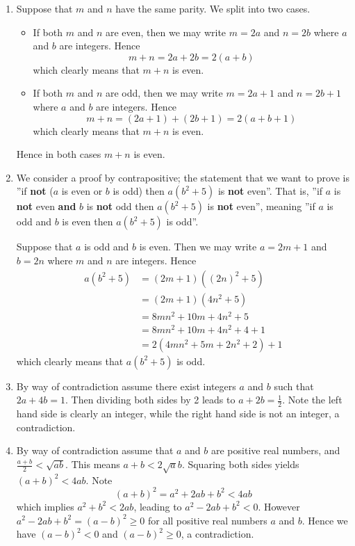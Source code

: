 \begin{enumerate}
    \item Suppose that $m$ and $n$ have the same parity. We split into two cases.
    \begin{itemize}
        \item If both $m$ and $n$ are even, then we may write $m = 2a$ and $n = 2b$ where $a$ and $b$ are integers. Hence
        \[
            m + n = 2a + 2b = 2(a+b)        
        \]
        which clearly means that $m + n$ is even.
        \item If both $m$ and $n$ are odd, then we may write $m = 2a + 1$ and $n = 2b + 1$ where $a$ and $b$ are integers. Hence
        \[
            m + n = (2a + 1) + (2b + 1) = 2(a + b + 1)        
        \]
        which clearly means that $m+n$ is even.
    \end{itemize}
    Hence in both cases $m + n$ is even.
    
    \item We consider a proof by contrapositive; the statement that we want to prove is ''if \textbf{not} ($a$ is even or $b$ is odd) then $a(b^2+5)$ is \textbf{not} even''. That is, ''if $a$ is \textbf{not} even \textbf{and} $b$ is \textbf{not} odd then $a(b^2+5)$ is \textbf{not} even'', meaning ''if $a$ is odd and $b$ is even then $a(b^2+5)$ is odd''.
    
    Suppose that $a$ is odd and $b$ is even. Then we may write $a = 2m + 1$ and $b = 2n$ where $m$ and $n$ are integers. Hence
    \begin{align*}
        a(b^2+5) &= (2m+1)\left((2n)^2 + 5\right)\\
        &= (2m+1)(4n^2 + 5)\\
        &= 8mn^2 + 10m + 4n^2 + 5\\
        &= 8mn^2 + 10m + 4n^2 + 4 + 1\\
        &= 2(4mn^2 + 5m + 2n^2 + 2) + 1
    \end{align*}
    which clearly means that $a(b^2+5)$ is odd.
    
    \item By way of contradiction assume there exist integers $a$ and $b$ such that $2a + 4b = 1$. Then dividing both sides by 2 leads to $a + 2b = \frac12$. Note the left hand side is clearly an integer, while the right hand side is not an integer, a contradiction.
    
    \item By way of contradiction assume that $a$ and $b$ are positive real numbers, and $\frac{a+b}{2} < \sqrt{ab}$. This means $a+b<2\sqrt ab$. Squaring both sides yields $(a+b)^2 < 4ab$. Note
    \[
        (a+b)^2 = a^2 + 2ab + b^2 < 4ab    
    \]
    which implies $a^2 + b^2 < 2ab$, leading to $a^2 - 2ab + b^2 < 0$. However $a^2 - 2ab + b^2 = (a-b)^2 \geq 0$ for all positive real numbers $a$ and $b$. Hence we have $(a-b)^2 < 0$ and $(a-b)^2 \geq 0$, a contradiction.
    

\end{enumerate}
